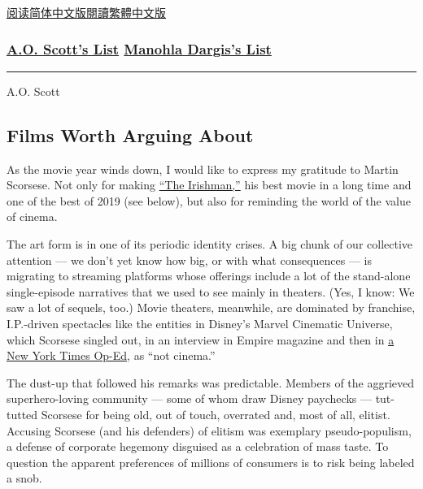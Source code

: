 \href{https://cn.nytimes.com/culture/20191205/best-films/}{阅读简体中文版}\href{https://cn.nytimes.com/culture/20191205/best-films/zh-hant/}{閱讀繁體中文版}

\hypertarget{ao-scotts-list--manohla-dargiss-list}{%
\subsubsection{\texorpdfstring{\protect\hyperlink{link-5eb84891}{A.O.
Scott's List} \textbar{} \protect\hyperlink{link-60ed588b}{Manohla
Dargis's
List}}{A.O. Scott's List \textbar{} Manohla Dargis's List}}\label{ao-scotts-list--manohla-dargiss-list}}

\begin{center}\rule{0.5\linewidth}{\linethickness}\end{center}

A.O. Scott

\hypertarget{films-worth-arguing-about}{%
\subsection{Films Worth Arguing About}\label{films-worth-arguing-about}}

As the movie year winds down, I would like to express my gratitude to
Martin Scorsese. Not only for making
\href{https://www.nytimes.com/2019/09/27/movies/the-irishman-review.html}{``The
Irishman,''} his best movie in a long time and one of the best of 2019
(see below), but also for reminding the world of the value of cinema.

The art form is in one of its periodic identity crises. A big chunk of
our collective attention --- we don't yet know how big, or with what
consequences --- is migrating to streaming platforms whose offerings
include a lot of the stand-alone single-episode narratives that we used
to see mainly in theaters. (Yes, I know: We saw a lot of sequels, too.)
Movie theaters, meanwhile, are dominated by franchise, I.P.-driven
spectacles like the entities in Disney's Marvel Cinematic Universe,
which Scorsese singled out, in an interview in Empire magazine and then
in
\href{https://www.nytimes.com/2019/11/04/opinion/martin-scorsese-marvel.html}{a
New York Times Op-Ed}, as ``not cinema.''

The dust-up that followed his remarks was predictable. Members of the
aggrieved superhero-loving community --- some of whom draw Disney
paychecks --- tut-tutted Scorsese for being old, out of touch, overrated
and, most of all, elitist. Accusing Scorsese (and his defenders) of
elitism was exemplary pseudo-populism, a defense of corporate hegemony
disguised as a celebration of mass taste. To question the apparent
preferences of millions of consumers is to risk being labeled a snob.

